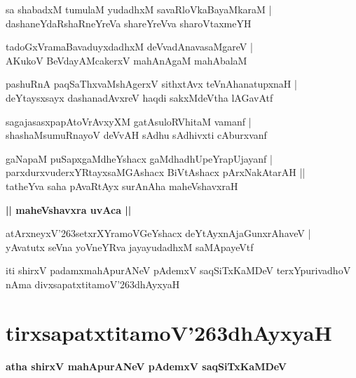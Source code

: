 \documentclass[twoside,12pt,openright]{book}
\def\S{\char'263}
\newcounter{shloka}[chapter]
\def\uvaca#1{\centerline{{\large\textbf{#1}}}}
\begin{document}
\begin{shloka}%
sa shabadxM tumulaM yudadhxM savaRloVkaBayaMkaraM |\\
dashaneYdaRshaRneYreVa shareYreVva sharoVtaxmeYH
\end{shloka}

\begin{shloka}%
tadoGxVramaBavaduyxdadhxM deVvadAnavasaMgareV |\\
AKukoV BeVdayAMcakerxV mahAnAgaM mahAbalaM
\end{shloka}

\begin{shloka}%
pashuRnA paqSaThxvaMshAgerxV sithxtAvx teVnAhanatupxnaH |\\
deYtaysxsayx dashanadAvxreV haqdi sakxMdeVtha lAGavAtf 
\end{shloka}

\begin{shloka}%
sagajasasxpapAtoVrAvxyXM gatAsuloRVhitaM vamanf |\\
shashaMsumuRnayoV deVvAH sAdhu sAdhivxti cAburxvanf
\end{shloka}

\begin{shloka}%
gaNapaM puSapxgaMdheYshacx gaMdhadhUpeYrapUjayanf |\\
parxdurxvuderxYRtayxsaMGAshacx BiVtAshacx pArxNakAtarAH ||\\
tatheYva saha pAvaRtAyx surAnAha maheVshavxraH 
\end{shloka}

\uvaca{|| maheVshavxra uvAca ||}

\begin{shloka}%
atArxneyxV\S setxrXYramoVGeYshacx deYtAyxnAjaGunxrAhaveV |\\
yAvatutx seVna yoVneYRva jayayudadhxM saMApayeVtf 
\end{shloka}

\begin{center}
iti shirxV padamxmahApurANeV pAdemxV saqSiTxKaMDeV terxYpurivadhoV nAma divxsapatxtitamoV\S dhAyxyaH 
\end{center}

\chapter{tirxsapatxtitamoV\S dhAyxyaH}

\begin{center}
{\LARGE\bfseries atha shirxV mahApurANeV pAdemxV saqSiTxKaMDeV}
\end{center}
\end{document}
